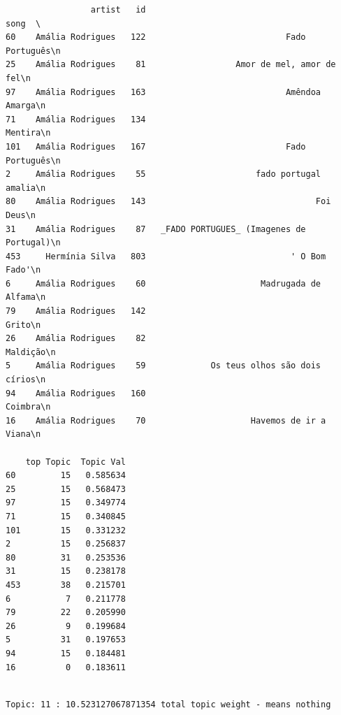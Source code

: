 \documentclass[11pt]{article}
\begin{document}
    
    \begin{verbatim}
                 artist   id                                        song  \
60    Amália Rodrigues   122                            Fado Português\n   
25    Amália Rodrigues    81                  Amor de mel, amor de fel\n   
97    Amália Rodrigues   163                            Amêndoa Amarga\n   
71    Amália Rodrigues   134                                   Mentira\n   
101   Amália Rodrigues   167                            Fado Português\n   
2     Amália Rodrigues    55                      fado portugal amalia\n   
80    Amália Rodrigues   143                                  Foi Deus\n   
31    Amália Rodrigues    87   _FADO PORTUGUES_ (Imagenes de Portugal)\n   
453     Hermínia Silva   803                             ' O Bom Fado'\n   
6     Amália Rodrigues    60                       Madrugada de Alfama\n   
79    Amália Rodrigues   142                                     Grito\n   
26    Amália Rodrigues    82                                  Maldição\n   
5     Amália Rodrigues    59             Os teus olhos são dois círios\n   
94    Amália Rodrigues   160                                   Coimbra\n   
16    Amália Rodrigues    70                     Havemos de ir a Viana\n   

    top Topic  Topic Val  
60         15   0.585634  
25         15   0.568473  
97         15   0.349774  
71         15   0.340845  
101        15   0.331232  
2          15   0.256837  
80         31   0.253536  
31         15   0.238178  
453        38   0.215701  
6           7   0.211778  
79         22   0.205990  
26          9   0.199684  
5          31   0.197653  
94         15   0.184481  
16          0   0.183611  
    \end{verbatim}

    
    \begin{Verbatim}[commandchars=\\\{\}]

Topic: 11 : 10.523127067871354 total topic weight - means nothing

    \end{Verbatim}
\end{document}
